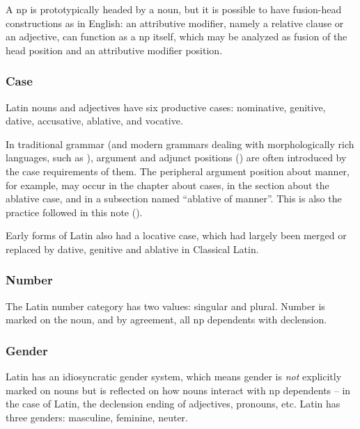 \documentclass{article}
\newcommand*{\citechap}[1]{chap.~{#1}}
\begin{document}
A \ac{np} is prototypically headed by a noun, 
but it is possible to have fusion-head constructions as in English:
an attributive modifier, namely a relative clause or an adjective, 
can function as a \ac{np} itself,
which may be analyzed as fusion of the head position and an attributive modifier position.


\subsubsection{Case}\label{sec:case-abs}

Latin nouns and adjectives have six productive cases:
nominative, genitive, dative, accusative, ablative, and vocative.

In traditional grammar (and modern grammars dealing with morphologically rich languages,
such as \citet[\citechap{8}]{jacques2021grammar}), 
argument and adjunct positions () 
are often introduced by the case requirements of them.
The peripheral argument position about manner, for example,
may occur in the chapter about cases, in the section about the ablative case,
and in a subsection named ``ablative of manner''.
This is also the practice followed in this note ().

Early forms of Latin also had a locative case, which had largely been merged or replaced by 
dative, genitive and ablative in Classical Latin.

\subsubsection{Number}

The Latin number category has two values: singular and plural.
Number is marked on the noun, and by agreement, all \ac{np} dependents with declension.

\subsubsection{Gender}

Latin has an idiosyncratic gender system, 
which means gender is \emph{not} explicitly marked on nouns
but is reflected on how nouns interact with \ac{np} dependents
-- in the case of Latin, the declension ending of adjectives, pronouns, etc. 
Latin has three genders: masculine, feminine, neuter.
\end{document}
